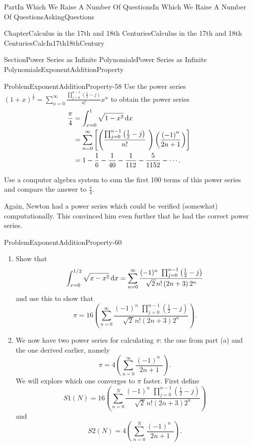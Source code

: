 \documentclass[oneside,10pt,]{book}
\numberwithin{equation}{part}
\newcommand{\dx}[1]{\,{\rm d}#1}
\newcommand{\amp}{&}
\begin{document}
\begin{partptx}{Part}{In Which We Raise A Number Of Questions}{}{In Which We Raise A Number Of Questions}{}{}{AskingQuestions}
\begin{chapterptx}{Chapter}{Calculus in the 17th and 18th Centuries}{}{Calculus in the 17th and 18th Centuries}{}{}{CalcIn17th18thCentury}
\begin{sectionptx}{Section}{Power Series as Infinite Polynomials}{}{Power Series as Infinite Polynomials}{}{}{ExponentAdditionProperty}
\begin{problem}{Problem}{}{ExponentAdditionProperty-58}
Use the power series \(\displaystyle
\left(1+x\right)^{\frac{1}{2}}=\sum_{n=0}^\infty\frac{\prod_{j=0}^{n-1}\left(\frac{1}{2}-j\right)}{n!}x^n\) to obtain the power series%
\begin{align*}
\frac{\pi}{4}\amp =\int_{x=0}^1\sqrt{1-x^2} \dx{ x}\\
\amp =\sum_{n=0}^\infty\left[\left(\frac{\prod_{j=0}^{n-1}\left(\frac{1}{2}-j\right)}{n!}\text{ } \right)\left(\frac{\left(-1\right)^n}{2n+1}\right)\right]\\
\amp =1-\frac{1}{6}-\frac{1}{40}-\frac{1}{112}-\frac{5}{1152}-\cdots\text{.}
\end{align*}
%
\par
Use a computer algebra system to sum the first 100 terms of this power series and compare the answer to \(\frac{\pi}{4}\).%
\end{problem}
Again, Newton had a power series which could be verified (somewhat) computationally.  This convinced him even further that he had the correct power series.%
\begin{problem}{Problem}{}{ExponentAdditionProperty-60}%
%
\begin{enumerate}[label={(\alph*)}]
\item{}Show that%
\begin{equation*}
\int_{x=0}^{1/2}\sqrt{x-x^2}\dx{ x}=\sum_{n=0}^\infty\frac{(-1)^n\,\,\prod_{j=0}^{n-1}\left(\frac{1}{2}-j\right)}{\sqrt{2\,}n!\left(2n+3\right)2^n}
\end{equation*}
and use this to show that%
\begin{equation*}
\pi=16\left(\sum_{n=0}^\infty\frac{(-1)^n\,\,\prod_{j=0}^{n-1}\left(\frac{1}{2}-j\right)}{\sqrt{2\,}n!\left(2n+3\right)2^n}\right)\text{.}
\end{equation*}
%
\item{}We now have two power series for calculating \(\pi\): the one from part (a) and the one derived earlier, namely%
\begin{equation*}
\pi=4\left(\sum_{n=0}^\infty\frac{(-1)^n\,\,}{2n+1}\right)\text{.}
\end{equation*}
We will explore which one converges to \(\pi\) faster. First define%
\begin{equation*}
S1(N)=16\left(\sum_{n=0}^N\frac{(-1)^n\,\,\prod_{j=0}^{n-1}\left(
\frac{1}{2}-j\right)}{\sqrt{2\,}n!\left(2n+3\right)2^n}\right)
\end{equation*}
and%
\begin{equation*}
S2(N)=4\left(\sum_{n=0}^N\frac{(-1)^n\,\,}{2n+1}\right)\text{.}
\end{equation*}

\end{enumerate}
\end{problem}
\end{sectionptx}
\end{chapterptx}
\end{partptx}
\end{document}

